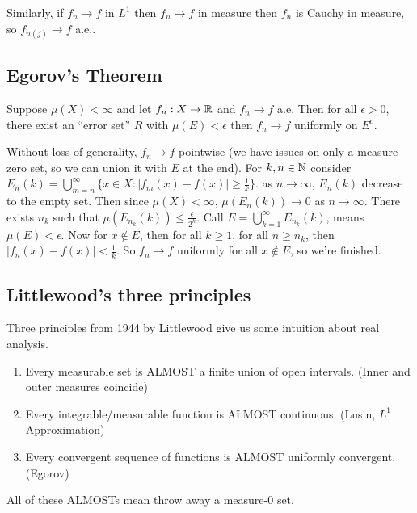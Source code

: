 Similarly, if $f_n \to f$ in $L^1$ then $f_n \to f$ in measure then $f_n$ is Cauchy in measure, so $f_{n(j)} \to f$ a.e..

\subsection{Egorov's Theorem}
\begin{theorem}
    Suppose $\mu(X) < \infty$ and let $f_n: X \to \operatorname{\mathbb{R}}$ and $f_n \to f$ a.e. Then for all $\epsilon > 0$,
    there exist an ``error set'' $R$ with $\mu(E) < \epsilon$ then $f_n \to f$ uniformly on $E^c$.
\end{theorem}
Without loss of generality, $f_n \to f$ pointwise (we have issues on only a measure zero set,
so we can union it with $E$ at the end). For $k, n \in \operatorname{\mathbb{N}}$ consider $E_{n}(k) = \bigcup_{m = n}^{\infty} \{ x\in X : |f_m(x) - f(x)| \ge \frac{1}{k}\}$.
as $n \to \infty$, $E_n(k)$ decrease to the empty set. Then since $\mu(X) < \infty$, $\mu(E_n(k)) \to 0$ as $n \to \infty$.
There exists $n_k$ such that $\mu(E_{n_k}(k)) \le \frac{\epsilon}{2^k}$. Call $E = \bigcup_{k = 1}^{\infty} E_{n_k}(k)$,
means $\mu(E) < \epsilon$. Now for $x \notin E$, then for all $k \ge 1$, for all $n \ge n_k$,
then $|f_n(x) - f(x)| < \frac{1}{k}$. So $f_n \to f$ uniformly for all $x \notin E$, so we're finished.

\subsection{Littlewood's three principles}
Three principles from 1944 by Littlewood give us some intuition about real analysis.
\begin{enumerate}
    \item Every measurable set is ALMOST a finite union of open intervals. (Inner and outer measures coincide)
    \item Every integrable/measurable function is ALMOST continuous. (Lusin, $L^1$ Approximation)
    \item Every convergent sequence of functions is ALMOST uniformly convergent. (Egorov)
\end{enumerate}
All of these ALMOSTs mean throw away a measure-0 set.